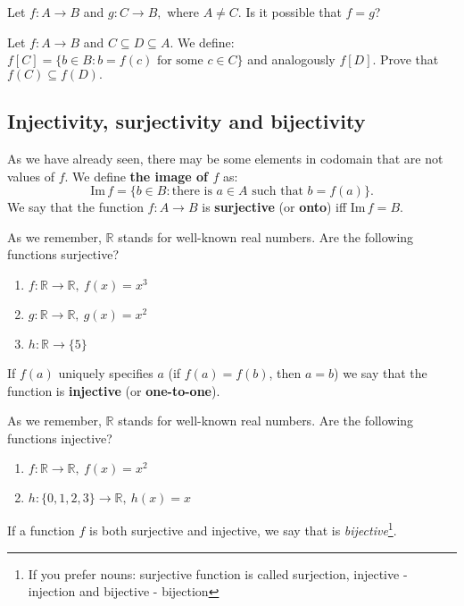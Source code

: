 \begin{prob}
	Let $f:A\to B$ and $g: C\to B,$ where $A\neq C$. Is it possible that $f=g$?
\end{prob}

\begin{prob}
	Let $f: A\to B$ and $C\subseteq D\subseteq A$. We define: $f[C] = \{b\in B : b=f(c) \text{ for some }c\in C \}$ and analogously $f[D]$. Prove that
	$f(C)\subseteq f(D).$
\end{prob}

\subsection{Injectivity, surjectivity and bijectivity}

\noindent As we have already seen, there may be some elements in codomain that are not values of
$f$. We define \textbf{the image of $f$} as:
$$\text{Im}\, f = \{b\in B : \text{there is } a\in A \text{ such that } b=f(a)\}.$$
We say that the function $f: A\to B$ is \textbf{surjective} (or \textbf{onto}) iff $\text{Im}\,f=B$.

\begin{prob}
	As we remember, $\mathbb{R}$ stands for well-known real numbers. Are the following functions surjective?
	\begin{enumerate}
		\item $f: \mathbb{R} \to \mathbb{R}, ~f(x)=x^3$
		\item $g: \mathbb{R} \to \mathbb{R}, ~g(x)=x^2$
		\item $h: \mathbb{R} \to \{5\}$
	\end{enumerate}
\end{prob}

If $f(a)$ uniquely specifies $a$ (if $f(a)=f(b)$, then $a=b$) we say that the function is \textbf{injective}
(or \textbf{one-to-one}).
\begin{prob}
	As we remember, $\mathbb{R}$ stands for well-known real numbers. Are the following functions injective?
	\begin{enumerate}
		\item $f: \mathbb{R} \to \mathbb R, ~f(x)=x^2$
		\item $h: \{0,1,2,3\} \to \mathbb R, ~h(x)=x$
	\end{enumerate}
\end{prob}

If a function $f$ is both surjective and injective, we say that is \textit{bijective}\footnote{If you prefer nouns: surjective function is called surjection, injective - injection
and bijective - bijection}.

